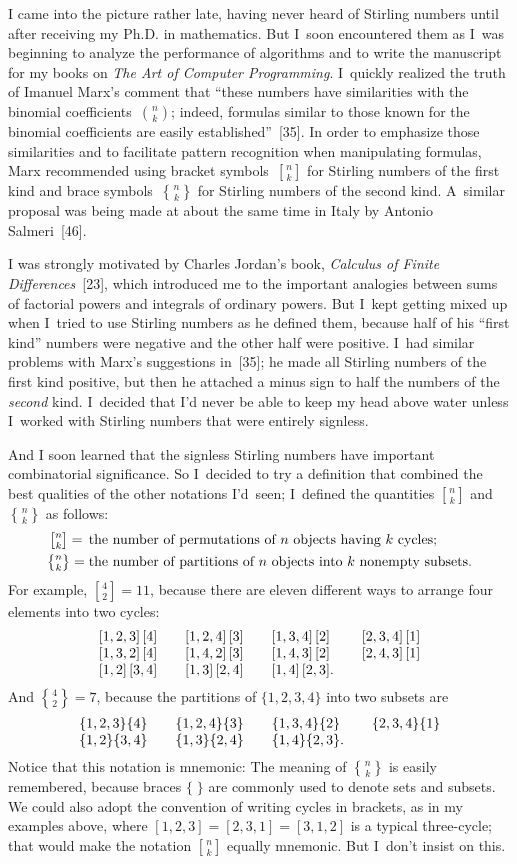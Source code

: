 I came into the picture rather late, having never heard of Stirling
numbers until after receiving my Ph.D. in mathematics. But I~soon
encountered them as I~was beginning to analyze the performance of
algorithms and to write the manuscript for my books on {\sl The Art of
Computer Programming}. I~quickly realized the truth of Imanuel Marx's
comment that ``these numbers have similarities with the binomial
coefficients~${n\choose k}$; indeed, formulas similar to those known
for the binomial coefficients are easily established''~[35]. In
order to emphasize those similarities and to facilitate pattern
recognition when manipulating formulas, Marx recommended using bracket
symbols~${n\brack k}$ for Stirling numbers of the first kind and brace
symbols~${n\brace k}$ for Stirling numbers of the second kind.
A~similar proposal was being made at about the same time in Italy by
Antonio Salmeri~[46].

I was strongly motivated by Charles Jordan's book, {\sl Calculus of
Finite Differences\/}~[23], which introduced me to the important
analogies between sums of factorial powers and integrals of ordinary
powers. 
But I~kept getting mixed up when I~tried to use Stirling numbers as he
defined them, because half of his ``first kind'' numbers were negative
and the other half were positive. I~had similar problems with Marx's
suggestions in~[35]; he made all Stirling numbers of the first kind
positive, but then he attached a minus sign to half the numbers of the
{\it second\/} kind. I~decided that I'd never be able to keep my head
above water unless I~worked with Stirling numbers that were entirely
signless.  

And I soon learned that the signless Stirling numbers have
important  combinatorial significance. So I~decided to try a
definition that combined the best qualities of the other notations
I'd~seen; I~defined the quantities ${n\brack k}$ and ${n\brace k}$
as follows:
$$\vcenter{\halign{\hfil$#\;$\hfil&#\hfil\cr
{n\brack k}=&the number of permutations of $n$ objects having $k$
cycles;\cr
\noalign{\smallskip}
{n\brace k}=&the number of partitions of $n$ objects into $k$ nonempty
subsets.\cr}}$$
For example, ${4\brack 2}=11$, because there are eleven different ways
to arrange four elements into two cycles:
$$\vcenter{\halign{$#$\hfil\qquad%
&$#$\hfil\qquad%
&$#$\hfil\qquad%
&$#$\hfil\cr
[1,2,3]\,[4]&[1,2,4]\,[3]&[1,3,4]\,[2]&[2,3,4]\,[1]\cr
[1,3,2]\,[4]&[1,4,2]\,[3]&[1,4,3]\,[2]&[2,4,3]\,[1]\cr
[1,2]\,[3,4]&[1,3]\,[2,4]&[1,4]\,[2,3].\cr}}$$
And ${4\brace 2}=7$, because the partitions of $\{1,2,3,4\}$ into two
subsets are
$$\vcenter{\halign{$#$\hfil\qquad%
&$#$\hfil\qquad%
&$#$\hfil\qquad%
&$#$\hfil\cr
\{1,2,3\}\{4\}&\{1,2,4\}\{3\}&\{1,3,4\}\{2\}&\{2,3,4\}\{1\}\cr
\{1,2\}\{3,4\}&\{1,3\}\{2,4\}&\{1,4\}\{2,3\}.\cr}}$$
Notice that this notation is mnemonic: The meaning of ${n\brace k}$
is easily remembered, because braces $\{\;\}$ are commonly used to
denote sets and subsets. We could also adopt the convention of
writing cycles in brackets, as in my examples above, where
$[1,2,3]=[2,3,1]=[3,1,2]$ is a typical three-cycle; that would make
the notation ${n\brack k}$ equally mnemonic. But I~don't insist on
this.

